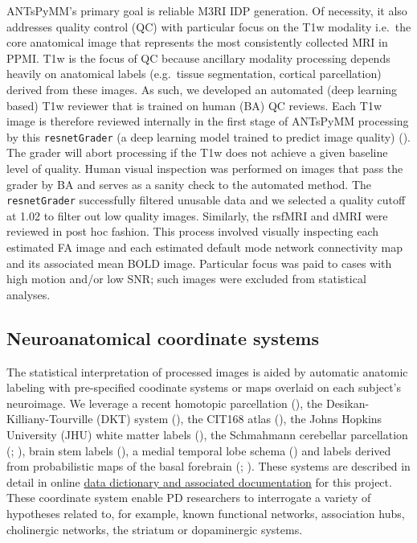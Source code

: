 \documentclass[
  table]{article}
\begin{document}
ANTsPyMM's primary goal is reliable M3RI IDP generation. Of necessity,
it also addresses quality control (QC) with particular focus on the T1w
modality i.e.~the core anatomical image that represents the most
consistently collected MRI in PPMI. T1w is the focus of QC because
ancillary modality processing depends heavily on anatomical labels
(e.g.~tissue segmentation, cortical parcellation) derived from these
images. As such, we developed an automated (deep learning based) T1w
reviewer that is trained on human (BA) QC reviews. Each T1w image is
therefore reviewed internally in the first stage of ANTsPyMM processing
by this \texttt{resnetGrader} (a deep learning model trained to predict
image quality) (). The grader will abort processing if the T1w does not achieve
a given baseline level of quality. Human visual inspection was performed
on images that pass the grader by BA and serves as a sanity check to the
automated method. The \texttt{resnetGrader} successfully filtered
unusable data and we selected a quality cutoff at 1.02 to filter out low
quality images. Similarly, the rsfMRI and dMRI were reviewed in post hoc
fashion. This process involved visually inspecting each estimated FA
image and each estimated default mode network connectivity map and its
associated mean BOLD image. Particular focus was paid to cases with high
motion and/or low SNR; such images were excluded from statistical
analyses.

\subsection{Neuroanatomical coordinate
systems}\label{neuroanatomical-coordinate-systems}

The statistical interpretation of processed images is aided by automatic
anatomic labeling with pre-specified coodinate systems or maps overlaid
on each subject's neuroimage. We leverage a recent homotopic
parcellation (), the
Desikan-Killiany-Tourville (DKT) system
(), the CIT168
atlas (), the Johns Hopkins University (JHU) white matter labels
(), the
Schmahmann cerebellar parcellation
(;
), brain stem
labels (), a
medial temporal lobe schema () and labels derived from probabilistic maps of the basal
forebrain (;
). These
systems are described in detail in online
\href{http://htmlpreview.github.io/?https://github.com/stnava/ANTsPyMM/blob/main/docs/make_dict_table.html}{data
dictionary and associated documentation} for this project. These
coordinate system enable PD researchers to interrogate a variety of
hypotheses related to, for example, known functional networks,
association hubs, cholinergic networks, the striatum or dopaminergic
systems.
\end{document}
